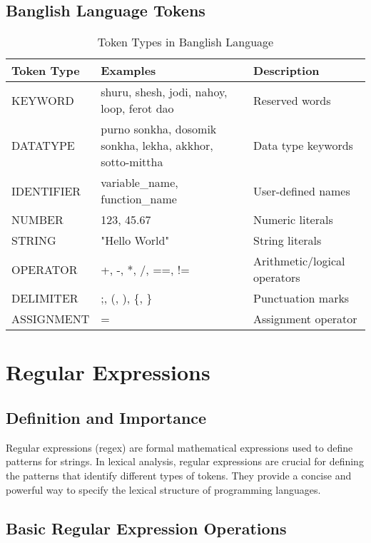 \documentclass[12pt,a4paper]{article}
\begin{document}
\subsection{Banglish Language Tokens}

\begin{table}[H]
\centering
\begin{tabular}{|p{3.2cm}|p{8cm}|p{4.3cm}|}
\hline
\rowcolor{lightgray!30}
\textbf{Token Type} & \textbf{Examples} & \textbf{Description} \\
\hline
KEYWORD & shuru, shesh, jodi, nahoy, loop, ferot dao & Reserved words \\
\hline
DATATYPE & purno sonkha, dosomik sonkha, lekha, akkhor, sotto-mittha & Data type keywords \\
\hline
IDENTIFIER & variable\_name, function\_name & User-defined names \\
\hline
NUMBER & 123, 45.67 & Numeric literals \\
\hline
STRING & "Hello World" & String literals \\
\hline
OPERATOR & +, -, *, /, ==, != & Arithmetic/logical operators \\
\hline
DELIMITER & ;, (, ), \{, \} & Punctuation marks \\
\hline
ASSIGNMENT & = & Assignment operator \\
\hline
\end{tabular}
\caption{Token Types in Banglish Language}
\end{table}

\section{Regular Expressions}

\subsection{Definition and Importance}

Regular expressions (regex) are formal mathematical expressions used to define patterns for strings. In lexical analysis, regular expressions are crucial for defining the patterns that identify different types of tokens. They provide a concise and powerful way to specify the lexical structure of programming languages.

\subsection{Basic Regular Expression Operations}
\end{document}
